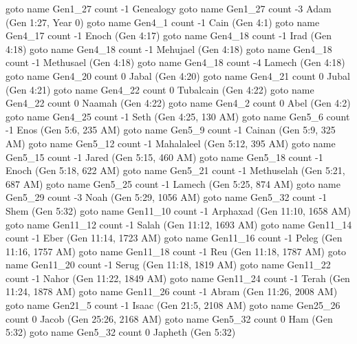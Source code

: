 \pdfoutline goto name {Gen1_27} count -1 {Genealogy}
\pdfoutline goto name {Gen1_27} count -3 {Adam (Gen 1:27, Year 0)}
 \pdfoutline goto name {Gen4_1}  count -1 {Cain (Gen 4:1)}
  \pdfoutline goto name {Gen4_17}  count -1 {Enoch (Gen 4:17)}
   \pdfoutline goto name {Gen4_18}  count -1 {Irad (Gen 4:18)}
    \pdfoutline goto name {Gen4_18}  count -1 {Mehujael (Gen 4:18)}
     \pdfoutline goto name {Gen4_18}  count -1 {Methusael (Gen 4:18)}
      \pdfoutline goto name {Gen4_18}  count -4 {Lamech (Gen 4:18)}
       \pdfoutline goto name {Gen4_20}  count 0 {Jabal (Gen 4:20)}
       \pdfoutline goto name {Gen4_21}  count 0 {Jubal (Gen 4:21)}
       \pdfoutline goto name {Gen4_22}  count 0 {Tubalcain (Gen 4:22)}
       \pdfoutline goto name {Gen4_22}  count 0 {Naamah (Gen 4:22)}
 \pdfoutline goto name {Gen4_2}  count 0 {Abel (Gen 4:2)}
 \pdfoutline goto name {Gen4_25} count -1 {Seth (Gen 4:25, 130 AM)}
  \pdfoutline goto name {Gen5_6}  count -1 {Enos (Gen 5:6, 235 AM)}
   \pdfoutline goto name {Gen5_9}  count -1 {Cainan (Gen 5:9, 325 AM)}
    \pdfoutline goto name {Gen5_12}  count -1 {Mahalaleel (Gen 5:12, 395 AM)}
     \pdfoutline goto name {Gen5_15}  count -1 {Jared (Gen 5:15, 460 AM)}
      \pdfoutline goto name {Gen5_18}  count -1 {Enoch (Gen 5:18, 622 AM)}
       \pdfoutline goto name {Gen5_21}  count -1 {Methuselah (Gen 5:21, 687 AM)}
        \pdfoutline goto name {Gen5_25}  count -1 {Lamech (Gen 5:25, 874 AM)}
         \pdfoutline goto name {Gen5_29}  count -3 {Noah (Gen 5:29, 1056 AM)}
          \pdfoutline goto name {Gen5_32}  count -1 {Shem (Gen 5:32)}
           \pdfoutline goto name {Gen11_10} count -1 {Arphaxad (Gen 11:10, 1658 AM)}
            \pdfoutline goto name {Gen11_12} count -1 {Salah (Gen 11:12, 1693 AM)}
             \pdfoutline goto name {Gen11_14} count -1 {Eber (Gen 11:14, 1723 AM)}
              \pdfoutline goto name {Gen11_16} count -1 {Peleg (Gen 11:16, 1757 AM)}
               \pdfoutline goto name {Gen11_18} count -1 {Reu (Gen 11:18, 1787 AM)}
                \pdfoutline goto name {Gen11_20} count -1 {Serug (Gen 11:18, 1819 AM)}
                 \pdfoutline goto name {Gen11_22} count -1 {Nahor (Gen 11:22, 1849 AM)}
                  \pdfoutline goto name {Gen11_24} count -1 {Terah (Gen 11:24, 1878 AM)}
                   \pdfoutline goto name {Gen11_26} count -1 {Abram (Gen 11:26, 2008 AM)}
                    \pdfoutline goto name {Gen21_5}  count -1 {Isaac (Gen 21:5, 2108 AM)}
                     \pdfoutline goto name {Gen25_26} count 0 {Jacob (Gen 25:26, 2168 AM)}
          \pdfoutline goto name {Gen5_32}  count 0 {Ham (Gen 5:32)}
          \pdfoutline goto name {Gen5_32}  count 0 {Japheth (Gen 5:32)}
